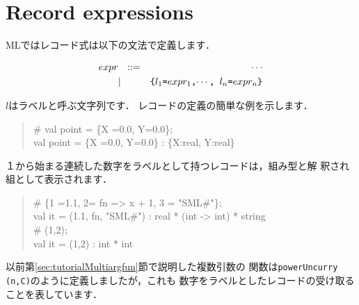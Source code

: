 \documentclass{jbook}
\newcommand{\txt}[2]{#2}
\begin{document}
\section{\txt{レコード構文}{Record expressions}}
\label{sec:extensionRecordExpression}

\ifx\jp%
	MLではレコード式は以下の文法で定義します．
\begin{tt}
\begin{eqnarray*}
expr &\mbox{\ \ }::=& \cdots \\
     &|& \mbox{\tt \{$l_1$=$expr_1$,$\cdots$, $l_n$=$expr_n$\}}
\end{eqnarray*}
\end{tt}
	$l$はラベルと呼ぶ文字列です．
	レコードの定義の簡単な例を示します．
\begin{tt}
\begin{quote}
\# val point = \{X =0.0, Y=0.0\};\\
val point = \{X =0.0, Y=0.0\} : \{X:real, Y:real\}
\end{quote}
\end{tt}
	１から始まる連続した数字をラベルとして持つレコードは，組み型と解
釈され組として表示されます．
\begin{tt}
\begin{quote}
\#  \{1 =1.1, 2= fn => x + 1, 3 = "SML\#"\};\\
val it = (1.1, fn, "SML\#") : real * (int -> int) * string\\
\# (1,2);\\
val it = (1,2) : int * int
\end{quote}
\end{tt}
	以前第\ref{sec:tutorialMultiargfun}節で説明した複数引数の
関数は{\tt powerUncurry (n,C)}のように定義しましたが，これも
数字をラベルとしたレコードの受け取ることを表しています．
\end{document}
